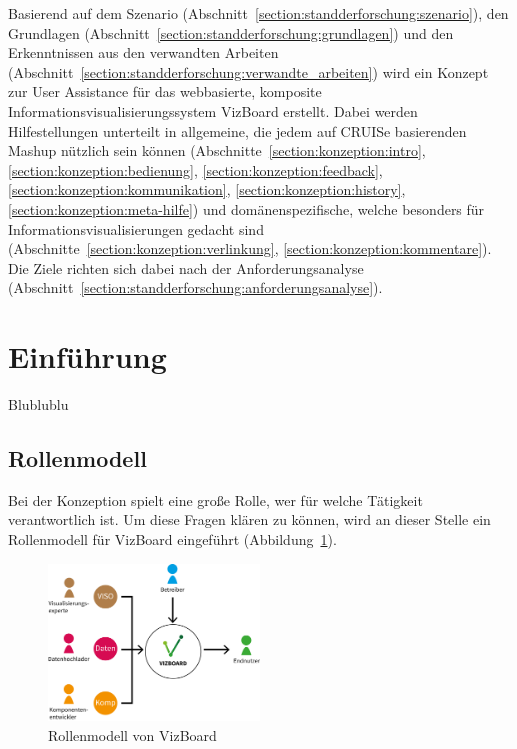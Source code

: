 \documentclass[
	headsepline,
	footsepline,
	fontsize=12pt,
	bibliography=totoc
]{scrbook}
\begin{document}
Basierend auf dem Szenario (Abschnitt~\ref{section:standderforschung:szenario}), den Grundlagen (Abschnitt~\ref{section:standderforschung:grundlagen}) und den Erkenntnissen aus den verwandten Arbeiten (Abschnitt~\ref{section:standderforschung:verwandte_arbeiten}) wird ein Konzept zur User Assistance für das webbasierte, komposite Informationsvisualisierungssystem VizBoard erstellt. Dabei werden Hilfestellungen unterteilt in allgemeine, die jedem auf CRUISe basierenden Mashup nützlich sein können (Abschnitte~\ref{section:konzeption:intro}, \ref{section:konzeption:bedienung}, \ref{section:konzeption:feedback}, \ref{section:konzeption:kommunikation}, \ref{section:konzeption:history}, \ref{section:konzeption:meta-hilfe}) und domänenspezifische, welche besonders für Informationsvisualisierungen gedacht sind (Abschnitte~\ref{section:konzeption:verlinkung}, \ref{section:konzeption:kommentare}). Die Ziele richten sich dabei nach der Anforderungsanalyse (Abschnitt~\ref{section:standderforschung:anforderungsanalyse}).

\section{Einführung}
\label{section:konzeption:einfuehrung}

Blublublu

\subsection{Rollenmodell}
\label{section:konzeption:einfuehrung:rollenmodell}

Bei der Konzeption spielt eine große Rolle, wer für welche Tätigkeit verantwortlich ist. Um diese Fragen klären zu können, wird an dieser Stelle ein Rollenmodell für VizBoard eingeführt (Abbildung~\ref{figure:rollenmodell}).

\begin{figure}[htbp]
   \centering
   \includegraphics[width=0.5\textwidth]{images/konzeption-rollenmodell.png}
   \caption{Rollenmodell von VizBoard}
   \label{figure:rollenmodell}
\end{figure}
\end{document}
